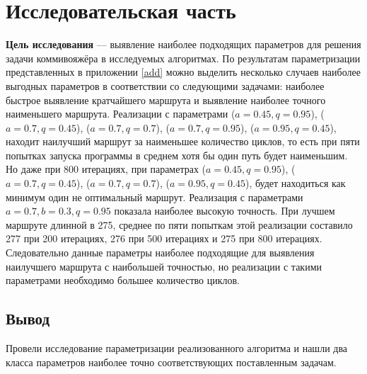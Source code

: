 \chapter{Исследовательская часть}

\textbf{Цель исследования} --- выявление наиболее подходящих параметров для решения задачи коммивояжёра в исследуемых алгоритмах. По результатам параметризации представленных в приложении \ref{add} можно выделить несколько случаев наиболее выгодных параметров в соответствии со следующими задачами: наиболее быстрое выявление кратчайшего маршрута и выявление наиболее точного наименьшего маршрута. Реализации с параметрами ($a = 0.45,  q = 0.95$), ($a = 0.7, q = 0.45$), ($a = 0.7, q = 0.7$), ($a = 0.7, q = 0.95$), ($a = 0.95, q = 0.45$), находит наилучший маршрут за наименьшее количество циклов, то есть при пяти попытках запуска программы в среднем хотя бы один путь будет наименьшим. Но даже при 800 итерациях, при параметрах ($a = 0.45,  q = 0.95$), ($a = 0.7, q = 0.45$), ($a = 0.7, q = 0.7$), ($a = 0.95, q = 0.45$), будет находиться как минимум один не оптимальный маршрут. Реализация с параметрами $a = 0.7, b = 0.3, q = 0.95$ показала наиболее высокую точность. При лучшем маршруте длинной в 275, среднее по пяти попыткам этой реализации составило 277 при 200 итерациях, 276 при 500 итерациях и 275 при 800 итерациях. Следовательно данные параметры наиболее подходящие для выявления наилучшего маршрута с наибольшей точностью, но реализации с такими параметрами необходимо большее количество циклов. 

\section{Вывод}

Провели исследование параметризации реализованного алгоритма и нашли два класса параметров наиболее точно соответствующих поставленным задачам.

\clearpage
